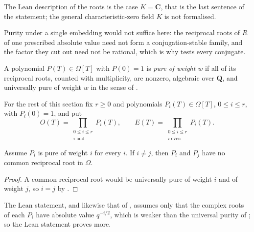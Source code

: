 The Lean description of the roots is the case $K=\mathbf C$, that is the
last sentence of the statement; the general characteristic-zero field $K$ is
not formalised.

Purity under a single embedding would not suffice here: the reciprocal roots
of $R$ of one prescribed absolute value need not form a conjugation-stable
family, and the factor they cut out need not be rational, which is why
 tests every conjugate.

\begin{definition}
\label{def:zla-pure-polynomial}
\leanok
A polynomial $P(T)\in\Omega[T]$ with $P(0)=1$ is \emph{pure of weight $w$} if
all of its reciprocal roots, counted with multiplicity, are nonzero, algebraic
over $\mathbf Q$, and universally pure of weight $w$ in the sense of
.
\end{definition}

For the rest of this section fix $r\geq0$ and polynomials
$P_i(T)\in\Omega[T]$, $0\leq i\leq r$, with $P_i(0)=1$, and put
\[
  O(T)=\prod_{\substack{0\leq i\leq r\\ i\text{ odd}}}P_i(T),
  \qquad
  E(T)=\prod_{\substack{0\leq i\leq r\\ i\text{ even}}}P_i(T).
\]

\begin{lemma}
\label{lem:zla-disjoint-weights}
\leanok
Assume $P_i$ is pure of weight $i$ for every $i$.  If $i\neq j$, then $P_i$
and $P_j$ have no common reciprocal root in $\Omega$.
\end{lemma}
\begin{proof}
\leanok
A common reciprocal root would be universally pure of weight $i$ and of weight
$j$, so $i=j$ by .
\end{proof}

The Lean statement, and likewise that of
, assumes only that the complex roots
of each $P_i$ have absolute value $q^{-i/2}$, which is weaker than the
universal purity of ; so the Lean statement
proves more.

